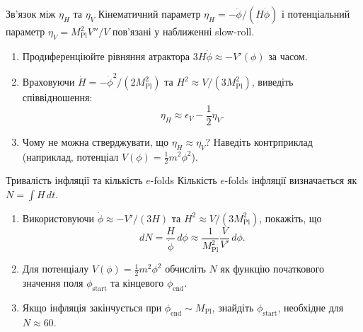 \begin{problem}{Зв'язок між $\eta_H$ та $\eta_V$}
Кінематичний параметр $\eta_H = -\ddot{\phi}/(H\dot{\phi})$ і потенціальний параметр
$\eta_V = M_{\mathrm{Pl}}^2 V''/V$ пов'язані у наближенні slow-roll.

\begin{enumerate}
    \item Продиференціюйте рівняння атрактора $3H\dot{\phi} \approx -V'(\phi)$ за часом.
    \item Враховуючи $\dot{H} = -\dot{\phi}^2/(2M_{\mathrm{Pl}}^2)$ та $H^2 \approx V/(3M_{\mathrm{Pl}}^2)$,
          виведіть співвідношення:
          \[
          \eta_H \approx \epsilon_V - \frac{1}{2}\eta_V.
          \]
    \item Чому не можна стверджувати, що $\eta_H \approx \eta_V$? Наведіть контрприклад
          (наприклад, потенціал $V(\phi) = \frac{1}{2}m^2\phi^2$).
\end{enumerate}
\end{problem}


\begin{problem}{Тривалість інфляції та кількість $e$-folds}
Кількість $e$-folds інфляції визначається як $N = \int H\,dt$.

\begin{enumerate}
    \item Використовуючи $\dot{\phi} \approx -V'/(3H)$ та $H^2 \approx V/(3M_{\mathrm{Pl}}^2)$,
          покажіть, що
          \[
          dN = \frac{H}{\dot{\phi}}\,d\phi \approx \frac{1}{M_{\mathrm{Pl}}^2}\frac{V}{V'}\,d\phi.
          \]
    \item Для потенціалу $V(\phi) = \frac{1}{2}m^2\phi^2$ обчисліть $N$ як функцію
          початкового значення поля $\phi_{\text{start}}$ та кінцевого $\phi_{\text{end}}$.
    \item Якщо інфляція закінчується при $\phi_{\text{end}} \sim M_{\mathrm{Pl}}$,
          знайдіть $\phi_{\text{start}}$, необхідне для $N \approx 60$.
\end{enumerate}
\end{problem}


